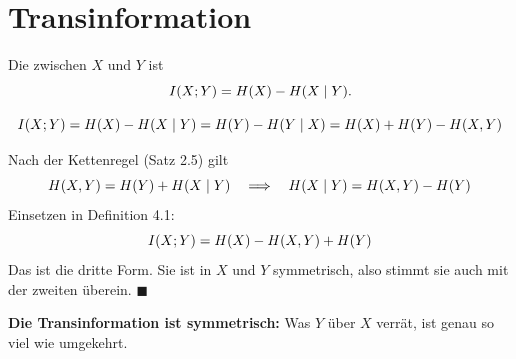 \section{Transinformation}

\begin{definition}
Die  zwischen $X$ und $Y$ ist
\[ I(X;Y) = H(X) - H(X\mid Y) . \]
\end{definition}

\begin{merksatz}
\[ I(X;Y) = H(X)-H(X\mid Y) = H(Y)-H(Y\mid X) = H(X)+H(Y)-H(X,Y) \]

Nach der Kettenregel (Satz 2.5) gilt
\[ H(X,Y) = H(Y) + H(X\mid Y) \quad\Longrightarrow\quad H(X\mid Y) = H(X,Y)-H(Y) \]
Einsetzen in Definition 4.1:
\[ I(X;Y) = H(X) - H(X,Y) + H(Y) \]
Das ist die dritte Form. Sie ist in $X$ und $Y$ symmetrisch, also stimmt sie auch mit der zweiten überein. $\blacksquare$

\begin{center}
\begin{minipage}{0.9\textwidth}
\textbf{Die Transinformation ist symmetrisch:} Was $Y$ über $X$ verrät, ist genau so viel wie umgekehrt.
\end{minipage}
\end{center}

\begin{center}
\begin{minipage}{0.88\textwidth}
\end{minipage}
\end{center}
\end{merksatz}

